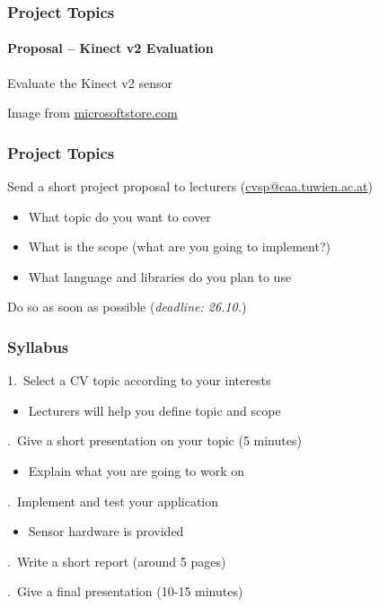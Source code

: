 \documentclass[xetex,professionalfont]{beamer}
\begin{document}

\begin{frame}
\frametitle{Project Topics}
\framesubtitle{Proposal -- Kinect v2 Evaluation}

Evaluate the Kinect v2 sensor

\bigskip
\begin{center}
	{\centering Image from \url{microsoftstore.com}}
\end{center}

\end{frame}


\begin{frame}
\frametitle{Project Topics}

Send a short project proposal to lecturers (\url{cvsp@caa.tuwien.ac.at})
\begin{itemize}
	\item What topic do you want to cover
	\item What is the scope (what are you going to implement?)
	\item What language and libraries do you plan to use
\end{itemize}

\bigskip
Do so as soon as possible (\emph{deadline: 26.10.})

\end{frame}


\begin{frame}
\frametitle{Syllabus}

1.\ Select a CV topic according to your interests
\begin{itemize}
	\item Lecturers will help you define topic and scope
\end{itemize}

.\ Give a short presentation on your topic (5 minutes)
\begin{itemize}
	\item Explain what you are going to work on
\end{itemize}

.\ Implement and test your application
\begin{itemize}
	\item Sensor hardware is provided
\end{itemize}

.\ Write a short report (around 5 pages)

.\ Give a final presentation (10-15 minutes)

\end{frame}
\end{document}
